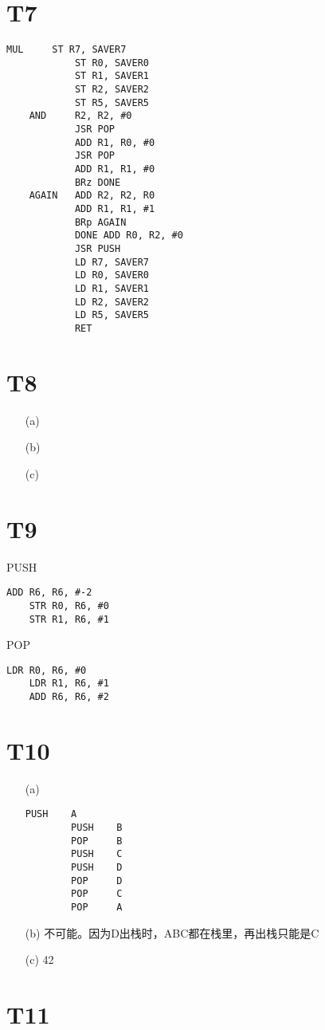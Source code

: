\documentclass{article}
\begin{document}
\section*{T7}
\begin{lstlisting}[basicstyle=\ttfamily,language={[x86masm]Assembler}]
    MUL     ST R7, SAVER7
            ST R0, SAVER0
            ST R1, SAVER1
            ST R2, SAVER2
            ST R5, SAVER5
    AND     R2, R2, #0
            JSR POP
            ADD R1, R0, #0
            JSR POP
            ADD R1, R1, #0
            BRz DONE
    AGAIN   ADD R2, R2, R0
            ADD R1, R1, #1
            BRp AGAIN
            DONE ADD R0, R2, #0
            JSR PUSH
            LD R7, SAVER7
            LD R0, SAVER0
            LD R1, SAVER1
            LD R2, SAVER2
            LD R5, SAVER5
            RET
\end{lstlisting}

\section*{T8}
\begin{enumerate}
    \item [(a)]
    \item [(b)]
    \item [(c)]
\end{enumerate}

\section*{T9}
PUSH
\begin{lstlisting}[basicstyle=\ttfamily,language={[x86masm]Assembler}]
    ADD R6, R6, #-2
    STR R0, R6, #0
    STR R1, R6, #1
\end{lstlisting}

POP
\begin{lstlisting}[basicstyle=\ttfamily,language={[x86masm]Assembler}]
    LDR R0, R6, #0
    LDR R1, R6, #1
    ADD R6, R6, #2
\end{lstlisting}

\section*{T10}
\begin{enumerate}
    \item [(a)]
    \begin{lstlisting}[basicstyle=\ttfamily,language={[x86masm]Assembler}]
        PUSH    A
        PUSH    B
        POP     B
        PUSH    C
        PUSH    D
        POP     D
        POP     C
        POP     A
    \end{lstlisting}
    \item [(b)]不可能。因为D出栈时，ABC都在栈里，再出栈只能是C
    \item [(c)]42
\end{enumerate}

\section*{T11}
\end{document}
